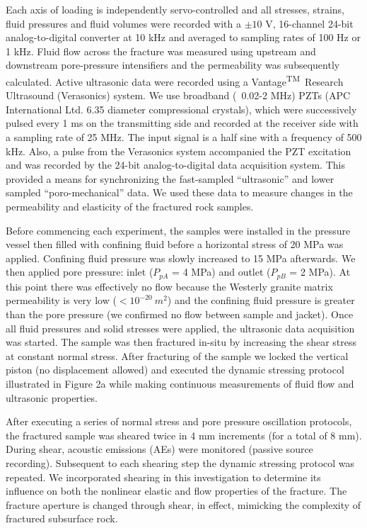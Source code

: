 \documentclass[draft]{agujournal2019}
\begin{document}
Each axis of loading is independently servo-controlled and all stresses, strains, fluid pressures and fluid volumes were recorded with a $\pm10$ V, 16-channel 24-bit analog-to-digital converter at 10 kHz and averaged to sampling rates of 100 Hz or 1 kHz. Fluid flow across the fracture was measured using upstream and downstream pore-pressure intensifiers and the permeability was subsequently calculated. Active ultrasonic data were recorded using a Vantage\textsuperscript{TM}\ Research Ultrasound (Verasonics) system. We use broadband (~0.02-2 MHz) PZTs (APC International Ltd. 6.35 diameter compressional crystals), which were successively pulsed every 1 ms on the transmitting side and recorded at the receiver side with a sampling rate of 25 MHz. The input signal is a half sine with a frequency of 500 kHz. Also, a pulse from the Verasonics system accompanied the PZT excitation and was recorded by the 24-bit analog-to-digital data acquisition system. This provided a means for synchronizing the fast-sampled “ultrasonic” and lower sampled “poro-mechanical” data. We used these data to measure changes in the permeability and elasticity of the fractured rock samples.

Before commencing each experiment, the samples were installed in the pressure vessel then filled with confining fluid before a horizontal stress of 20 MPa was applied. Confining fluid pressure was slowly increased to 15 MPa afterwards. We then applied pore pressure: inlet ($P_{pA}$ = 4 MPa) and outlet ($P_{pB}$ = 2 MPa). At this point there was effectively no flow because the Westerly granite matrix permeability is very low ($< 10^{-20}\ m^2$) and the confining fluid pressure is greater than the pore pressure (we confirmed no flow between sample and jacket). Once all fluid pressures and solid stresses were applied, the ultrasonic data acquisition was started. The sample was then fractured in-situ by increasing the shear stress at constant normal stress. After fracturing of the sample we locked the vertical piston (no displacement allowed) and executed the dynamic stressing protocol illustrated in Figure 2a while making continuous measurements of fluid flow and ultrasonic properties.

After executing a series of normal stress and pore pressure oscillation protocols, the fractured sample was sheared twice in 4 mm increments (for a total of 8 mm). During shear, acoustic emissions (AEs) were monitored (passive source recording). Subsequent to each shearing step the dynamic stressing protocol was repeated. We incorporated shearing in this investigation to determine its influence on both the nonlinear elastic and flow properties of the fracture. The fracture aperture is changed through shear, in effect, mimicking the complexity of fractured subsurface rock.
\end{document}

